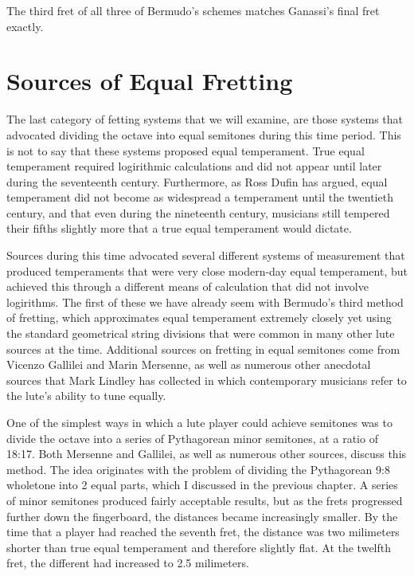 

The third fret of all three of Bermudo's schemes matches Ganassi's final fret exactly.




\section{Sources of Equal Fretting}

The last category of fetting systems that we will examine, are those systems that advocated
dividing the octave into equal semitones during this time period.  This is not to say that these
systems proposed equal temperament.  True
equal temperament required logirithmic calculations and did not appear until later during the
seventeenth century.  Furthermore, as Ross Dufin has argued, equal temperament did not become
as widespread a temperament until the twentieth century, and that even during the nineteenth
century, musicians still tempered their fifths slightly more that a true equal temperament would
dictate.

Sources during this time advocated several different systems of measurement that produced
temperaments that were very close modern-day equal temperament, but achieved this through
a different means of calculation that did not involve logirithms.  The first of these
we have already seem with Bermudo's third method of fretting, which approximates equal temperament
extremely closely yet using the standard geometrical string divisions that were common in many
other lute sources at the time.  Additional sources on
fretting in equal semitones come from Vicenzo Gallilei and Marin Mersenne, as well as
numerous other anecdotal sources that Mark Lindley has collected in which contemporary
musicians refer to the lute's ability to tune equally.

One of the simplest ways in which a lute player could achieve
semitones was to divide the octave into a series of Pythagorean minor semitones, at a ratio of
18:17.  Both Mersenne and Gallilei, as well as numerous other sources, discuss this method.  The
idea originates with the problem of dividing the Pythagorean 9:8 wholetone into 2 equal parts,
which I discussed in the previous chapter.  A series of minor semitones produced fairly
acceptable results, but as the frets progressed further down the fingerboard, the distances
became increasingly smaller.  By the time that a player had reached the seventh fret, the distance
was two milimeters shorter than true equal temperament and therefore slightly flat.  At the
twelfth fret, the different had increased to 2.5 milimeters.


